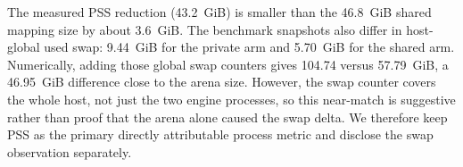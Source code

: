 The measured PSS reduction (43.2~GiB) is smaller than the 46.8~GiB shared mapping size by about 3.6~GiB. The benchmark snapshots also differ in host-global used swap: 9.44~GiB for the private arm and 5.70~GiB for the shared arm. Numerically, adding those global swap counters gives 104.74 versus 57.79~GiB, a 46.95~GiB difference close to the arena size. However, the swap counter covers the whole host, not just the two engine processes, so this near-match is suggestive rather than proof that the arena alone caused the swap delta. We therefore keep PSS as the primary directly attributable process metric and disclose the swap observation separately.

